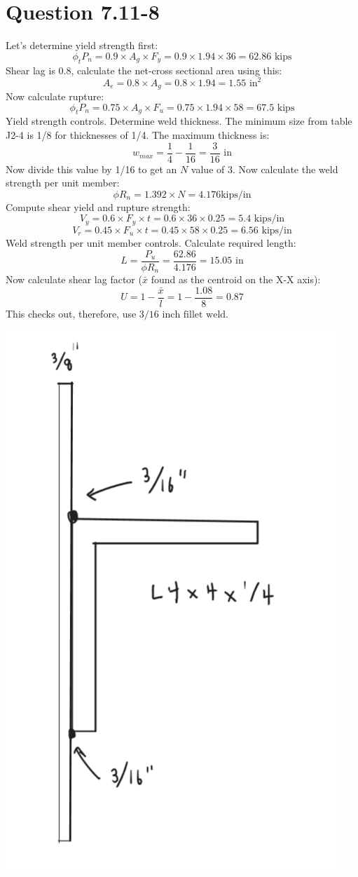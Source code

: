 \documentclass{article}
\begin{document}
\section*{Question 7.11-8}
Let's determine yield strength first: 
\[\phi_t P_n=0.9\times A_g\times F_y= 0.9\times 1.94\times 36=62.86\text{ kips}\]
Shear lag is 0.8, calculate the net-cross sectional area using this: 
\[A_e=0.8\times A_g=0.8\times 1.94=1.55\text{ in}^2\] 
Now calculate rupture: 
\[\phi_t P_n=0.75\times A_g\times F_u= 0.75\times 1.94\times 58=67.5\text{ kips}\] 
Yield strength controls. Determine weld thickness. The minimum size from table J2-4 is 1/8 for thicknesses of 1/4. The maximum thickness is: 
\[w_{max}=\frac{1}{4}-\frac{1}{16}=\frac{3}{16}\text{ in}\]
Now divide this value by 1/16 to get an $N$ value of 3. Now calculate the weld strength per unit member: 
\[\phi R_n=1.392\times N=4.176 \text{kips/in}\]
Compute shear yield and rupture strength: 
\[V_y= 0.6\times F_y\times t= 0.6\times 36\times 0.25= 5.4\text{ kips/in}\] 
\[V_r=0.45\times F_u\times t=0.45\times 58\times 0.25 = 6.56\text{ kips/in}\]
Weld strength per unit member controls. Calculate required length: 
\[L=\frac{P_u}{\phi R_n}=\frac{62.86}{4.176}=15.05\text{ in}\] 
Now calculate shear lag factor ($\bar{x}$ found as the centroid on the X-X axis): 
\[U=1-\frac{\bar{x}}{l}=1-\frac{1.08}{8}=0.87\]
This checks out, therefore, use $\boxed{3/16\text{ inch fillet weld}}$.
\begin{center}
    \includegraphics*[scale=0.5]{fig3.png}
\end{center}
\end{document}

